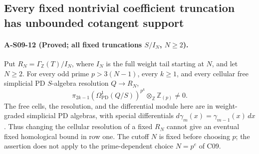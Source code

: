 \subsection{Every fixed nontrivial coefficient truncation has unbounded cotangent support}

\paragraph{A-S09-12 (Proved; all fixed truncations $S/I_N$, $N\geq2$).}
Put $R_N=\Gamma_{\mathbb Z}(T)/I_N$, where $I_N$ is the full
weight tail starting at $N$, and let $N\geq2$.  For every odd
prime $p>3(N-1)$, every $k\geq1$, and every cellular free
simplicial PD $S$-algebra resolution $Q\to R_N$,
\[
 \pi_{2k-1}\!\left(\Omega^1_{\mathrm{PD}}(Q/S)\right)^{p^k}
          \otimes_{\mathbb Z}\mathbb Z_{(p)}\ne0.
 \tag{S09.21}
\]
The free cells, the resolution, and the differential module here
are in weight-graded simplicial PD algebras, with special
differentials $d\gamma_m(x)=\gamma_{m-1}(x)\,dx$.
Thus changing the cellular resolution of a fixed $R_N$ cannot
give an eventual fixed homological bound in row one.  The
cutoff $N$ is fixed before choosing $p$; the assertion does
not apply to the prime-dependent choice $N=p^e$ of C09.

